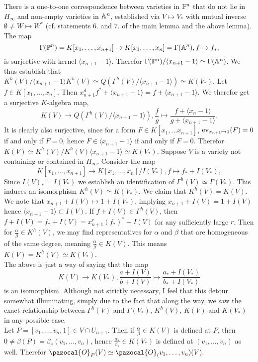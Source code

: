     \begin{remark}\label{CorrespondenceBetweenProjVarAwayFromHypPlaneAtInfinityAndNonEmptyAffineVar}
        There is a one-to-one correspondence between varieties in $\mathbb{P}^n$ that do not lie in $H_\infty$ and non-empty varieties in $\mathbb{A}^n$, established via $V\mapsto V_\ast$ with mutual inverse $\emptyset\neq W\mapsto W^\ast$ (cf. statements 6. and 7. of the main lemma and the above lemma). The map
        $$\Gamma(\mathbb{P}^n)=K[x_1,\dots,x_{n+1}]\rightarrow K[x_1,\dots,x_n]=\Gamma(\mathbb{A}^n), f\mapsto f_\ast,$$
        is surjective with kernel $\langle x_{n+1}-1\rangle$. Therefor $\Gamma(\mathbb{P}^n)/\langle x_{n+1}-1\rangle \simeq \Gamma(\mathbb{A}^n)$. We thus establish that $K^h(V)/\langle x_{n+1}-1\rangle K^h(V)\simeq Q(\Gamma^h(V)/\langle x_{n+1}-1\rangle)\simeq K(V_\ast)$. Let $f\in K[x_1,\dots,x_n]$. Then $x_{n+1}^df^\ast + \langle x_{n+1}-1\rangle = f+\langle x_{n+1}-1\rangle$. We therefor get a surjective $K$-algebra map,
        $$K(V) \rightarrow Q(\Gamma^h(V)/\langle x_{n+1}-1\rangle), \frac{f}{g}\mapsto \frac{f+\langle x_n-1\rangle }{g+\langle x_{n+1}-1\rangle}.$$
        It is clearly also surjective, since for a form $F\in K[x_1,\dots x_{n+1}]$, $\mathrm{ev}_{x_{n+1}\mapsto 1}(F) = 0$ if and only if $F=0$, hence $F\in \langle x_{n+1}-1\rangle$ if and only if $F = 0$. Therefor $K(V)\simeq K^h(V)/K^h(V)\langle x_{n+1}-1\rangle \simeq K(V_\ast)$. Suppose $V$ is a variety not containing or contained in $H_\infty$. Consider the map 
        $$K[x_1,\dots,x_{n+1}]\rightarrow K[x_1,\dots,x_n]/I(V_\ast), f\mapsto f_\ast + I(V_\ast),$$
        Since $I(V)_\ast = I(V_\ast)$ we establish an identification of $\Gamma^h(V)\simeq \Gamma(V_\ast)$. This induces an isomorphism $K^h(V)\simeq K(V_\ast)$. We claim that $K^h(V)= K(V)$. We note that $x_{n+1} +I(V) \mapsto 1+ I(V_\ast)$, implying $x_{n+1}+I(V) = 1+ I(V)$ hence $\langle x_{n+1}-1\rangle \subset I(V)$. If $f +I(V) \in\Gamma^h(V)$, then $f + I(V) = f_\ast + I(V) = x_{n+1}^r(f_\ast)^\ast+I(V)$ for any sufficiently large $r$. Then for $\frac{\alpha}{\beta}\in K^h(V)$, we may find representatives for $\alpha$ and $\beta$ that are homogeneous of the same degree, meaning $\frac{\alpha}{\beta}\in K(V)$. This means $K(V)=K^h(V)\simeq K(V_\ast)$.\\
        The above is just a way of saying that the map 
        $$K(V)\rightarrow K(V_\ast), \frac{a+I(V)}{b+I(V)}\mapsto \frac{a_\ast + I(V_\ast)}{b_\ast+I(V_\ast)}$$
        is an isomorphism. Although not strictly necessary, I feel that this detour somewhat illuminating, simply due to the fact that along the way, we saw the exact relationship between $\Gamma^h(V)$ and $\Gamma(V_\ast)$, $K^h(V)$, $K(V)$ and $K(V_\ast)$ in any possible case.\\
        Let $P=[v_1,\dots,v_n,1]\in V\cap U_{n+1}$. Then if $\frac{\alpha}{\beta}\in K(V)$ is defined at $P$, then $0\neq \beta(P) = \beta_\ast(v_1,\dots,v_n)$, hence $\frac{\alpha_\ast}{\beta_\ast}\in K(V_\ast)$ is defined at $(v_1,\dots,v_n)$ as well. Therefor $\pazocal{O}_P(V)\simeq \pazocal{O}_(v_1,\dots,v_n)(V).$
    \end{remark}

